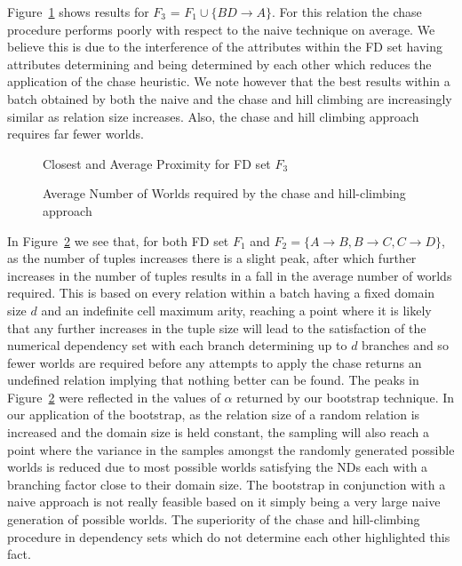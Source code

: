 Figure~\ref{graph:4.2} shows results for
$F_3$ = $F_1 \cup \{ BD \to A \}$. For this relation
the chase procedure performs poorly with respect to the naive technique
on average. We believe this is due to the interference of the attributes
within the FD set having attributes determining and being determined by
each other which reduces the application of the chase heuristic.
 We note however that the best results within a batch obtained by both
the naive and the chase and hill climbing are increasingly similar as
relation size increases. Also, the chase and hill climbing approach requires
far fewer worlds.

\begin{figure}
\centerline{}
\caption{\label{graph:4.2}\scriptsize{Closest and Average Proximity for FD set $F_3$  }}
\end{figure}

\begin{figure}
\centerline{}
\caption{\label{graph:4.3}\scriptsize{ Average Number of Worlds required by
the chase and hill-climbing approach}}
\end{figure}

In Figure~\ref{graph:4.3} we see that, for both FD set $F_1$ and 
$F_2 = \{ A \to B, B \to C, C \to D \}$, as the number of tuples
increases there is a slight peak, after which further increases in the number
of tuples results in a fall in the average number of worlds required.
This is based on every relation within a batch having a fixed domain
size $d$ and an indefinite cell maximum arity, reaching a point where it is
likely that any further increases in the tuple size will lead to the
satisfaction of the numerical dependency set with each branch determining
up to $d$ branches and so fewer worlds are required before any 
attempts to apply the chase returns an undefined relation implying that
nothing better can be found. The peaks in Figure~\ref{graph:4.3} were reflected in the values
of $\alpha$ returned by our bootstrap technique. In our
application of the bootstrap, as the relation size of a random relation 
is increased and the domain size is held constant, the sampling will also
reach a point where the variance in the samples amongst the randomly
generated possible worlds is reduced due to most possible worlds 
satisfying the NDs each with a branching factor close to their domain
size.  The bootstrap in conjunction 
with a naive approach is not really feasible based on it simply being
a very large naive generation of possible worlds. The superiority of
the chase and hill-climbing
procedure in dependency sets which do not determine each other highlighted
this fact.


